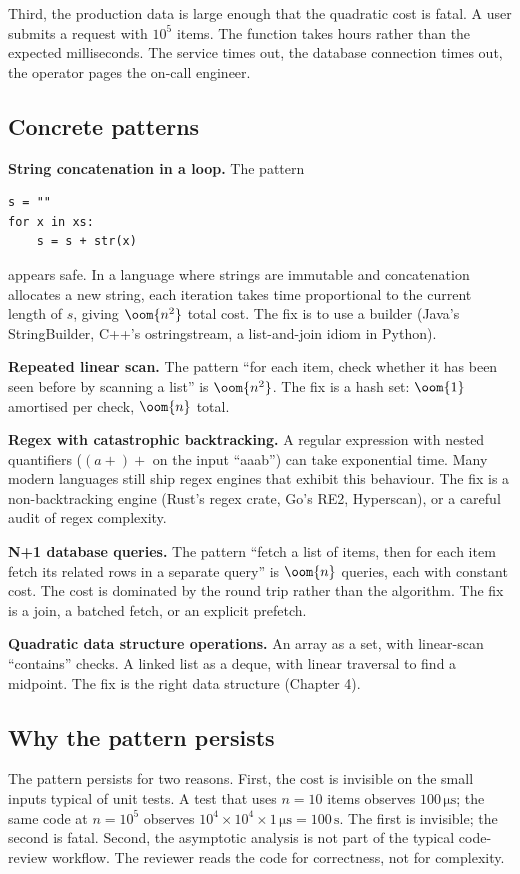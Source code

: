 Third, the production data is large enough that the quadratic cost is fatal. A user submits a request with $10^5$ items. The function takes hours rather than the expected milliseconds. The service times out, the database connection times out, the operator pages the on-call engineer.

\subsection{Concrete patterns}

\textbf{String concatenation in a loop.} The pattern
\begin{verbatim}
s = ""
for x in xs:
    s = s + str(x)
\end{verbatim}
appears safe. In a language where strings are immutable and concatenation allocates a new string, each iteration takes time proportional to the current length of $s$, giving $\oom{n^2}$ total cost. The fix is to use a builder (Java's StringBuilder, C++'s ostringstream, a list-and-join idiom in Python).

\textbf{Repeated linear scan.} The pattern ``for each item, check whether it has been seen before by scanning a list'' is $\oom{n^2}$. The fix is a hash set: $\oom{1}$ amortised per check, $\oom{n}$ total.

\textbf{Regex with catastrophic backtracking.} A regular expression with nested quantifiers ($(a+)+$ on the input ``aaab'') can take exponential time. Many modern languages still ship regex engines that exhibit this behaviour. The fix is a non-backtracking engine (Rust's regex crate, Go's RE2, Hyperscan), or a careful audit of regex complexity.

\textbf{N+1 database queries.} The pattern ``fetch a list of items, then for each item fetch its related rows in a separate query'' is $\oom{n}$ queries, each with constant cost. The cost is dominated by the round trip rather than the algorithm. The fix is a join, a batched fetch, or an explicit prefetch.

\textbf{Quadratic data structure operations.} An array as a set, with linear-scan ``contains'' checks. A linked list as a deque, with linear traversal to find a midpoint. The fix is the right data structure (Chapter 4).

\subsection{Why the pattern persists}

The pattern persists for two reasons. First, the cost is invisible on the small inputs typical of unit tests. A test that uses $n = 10$ items observes $100\,\si{\micro\second}$; the same code at $n = 10^5$ observes $10^4 \times 10^4 \times 1\,\si{\micro\second} = 100\,\si{\second}$. The first is invisible; the second is fatal. Second, the asymptotic analysis is not part of the typical code-review workflow. The reviewer reads the code for correctness, not for complexity.

